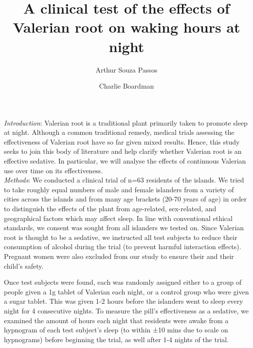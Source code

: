 \documentclass[10pt,preprintnumbers,amsmath,amssymb,floatfix,twocolumn,prl]{revtex4-2}
\begin{document}
\title{A clinical test of the effects of Valerian root on waking hours at night}
\author{Arthur Souza Passos}
\author{Charlie Boardman}

\maketitle

\textit{Introduction}: Valerian root is a traditional plant primarily taken to promote sleep at night. Although a common traditional remedy, medical trials assessing the effectiveness of Valerian root have so far given mixed results. Hence, this study seeks to join this body of literature and help clarify whether Valerian root is an effective sedative. In particular, we will analyse the effects of continuous Valerian use over time on its effectiveness. \\

\textit{Methods}: 
We conducted a clinical trial of n=63 residents of the islands. We tried to take roughly equal numbers of male and female islanders from a variety of cities across the islands and from many age brackets (20-70 years of age) in order to distinguish the effects of the plant from age-related, sex-related, and geographical factors which may affect sleep. In line with conventional ethical standards, we consent was sought from all islanders we tested on. Since Valerian root is thought to be a sedative, we instructed all test subjects to reduce their consumption of alcohol during the trial (to prevent harmful interaction effects). Pregnant women were also excluded from our study to ensure their and their child’s safety. \

Once test subjects were found, each was randomly assigned either to a group of people given a 1g tablet of Valerian each night, or a control group who were given a sugar tablet. This was given 1-2 hours before the islanders went to sleep every night for 4 consecutive nights. To measure the pill’s effectiveness as a sedative, we examined the amount of hours each night that residents were awake from a hypnogram of each test subject’s sleep (to within ±10 mins due to scale on hypnograms) before beginning the trial, as well after 1-4 nights of the trial.  \\
\end{document}
